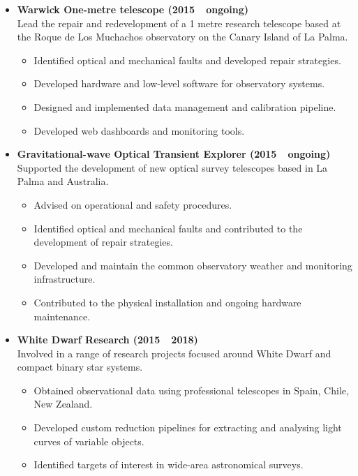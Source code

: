 \documentclass[print]{cv-style}
\begin{document}
\begin{entrylist}
\entry
  {}{}{}
  {
  \begin{itemize}
    \item \textbf{Warwick One-metre telescope (2015~\textendash~ongoing)}\\
    Lead the repair and redevelopment of a 1 metre research telescope based at the Roque de Los Muchachos observatory on the Canary Island of La Palma.
    \begin{itemize}
      \item Identified optical and mechanical faults and developed repair strategies.
      \item Developed hardware and low-level software for observatory systems.
      \item Designed and implemented data management and calibration pipeline.
      \item Developed web dashboards and monitoring tools.
    \end{itemize}
    \item \textbf{Gravitational-wave Optical Transient Explorer (2015~\textendash~ongoing)}\\
    Supported the development of new optical survey telescopes based in La Palma and Australia.
    \begin{itemize}
      \item Advised on operational and safety procedures.
      \item Identified optical and mechanical faults and contributed to the development of repair strategies.
      \item Developed and maintain the common observatory weather and monitoring infrastructure.
      \item Contributed to the physical installation and ongoing hardware maintenance.
    \end{itemize}
    \item \textbf{White Dwarf Research (2015~\textendash~2018)}\\
    Involved in a range of research projects focused around White Dwarf and compact binary star systems.
    \begin{itemize}
      \item Obtained observational data using professional telescopes in Spain, Chile, New Zealand.
      \item Developed custom reduction pipelines for extracting and analysing light curves of variable objects.
      \item Identified targets of interest in wide-area astronomical surveys.

\end{itemize}
\end{itemize}}
\end{entrylist}
\end{document}
